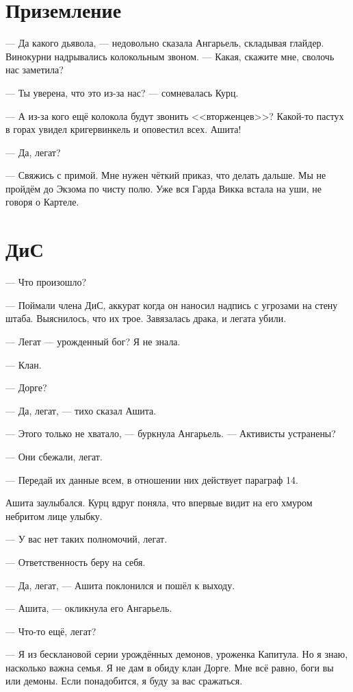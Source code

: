 \section{Приземление}

--- Да какого дьявола, --- недовольно сказала Ангарьель, складывая глайдер.
Винокурни надрывались колокольным звоном.
--- Какая, скажите мне, сволочь нас заметила?

--- Ты уверена, что это из-за нас? --- сомневалась Курц.

--- А из-за кого ещё колокола будут звонить <<вторженцев>>?
Какой-то пастух в горах увидел кригервинкель и оповестил всех.
Ашита!

--- Да, легат?

--- Свяжись с примой.
Мне нужен чёткий приказ, что делать дальше.
Мы не пройдём до Экзома по чисту полю.
Уже вся Гарда Викка встала на уши, не говоря о Картеле.

\section{ДиС}

--- Что произошло?

--- Поймали члена ДиС, аккурат когда он наносил надпись с угрозами на стену штаба.%
Выяснилось, что их трое.
Завязалась драка, и легата убили.

--- Легат --- урожденный бог?
Я не знала.

--- Клан.

--- Дорге?

--- Да, легат, --- тихо сказал Ашита.

--- Этого только не хватало, --- буркнула Ангарьель.
--- Активисты устранены?

--- Они сбежали, легат.

--- Передай их данные всем, в отношении них действует параграф 14.

Ашита заулыбался.
Курц вдруг поняла, что впервые видит на его хмуром небритом лице улыбку.

--- У вас нет таких полномочий, легат.

--- Ответственность беру на себя.

--- Да, легат, --- Ашита поклонился и пошёл к выходу.

--- Ашита, --- окликнула его Ангарьель.

--- Что-то ещё, легат?

--- Я из бесклановой серии урождённых демонов, уроженка Капитула.
Но я знаю, насколько важна семья.
Я не дам в обиду клан Дорге.
Мне всё равно, боги вы или демоны.
Если понадобится, я буду за вас сражаться.

